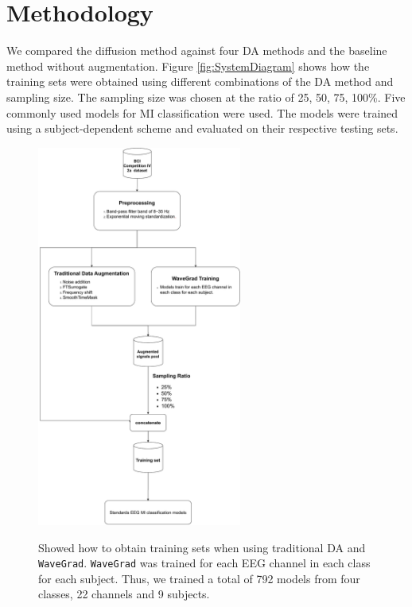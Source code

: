 \section{Methodology}
We compared the diffusion method against four DA methods and the baseline method without augmentation.
Figure \ref{fig:SystemDiagram} shows how the training sets were obtained using different combinations of the DA method and sampling size.
The sampling size was chosen at the ratio of 25, 50, 75, 100\%.
Five commonly used models for MI classification were used.
The models were trained using a subject-dependent scheme and evaluated on their respective testing sets. 

\begin{figure}[ht!]
  \centering
  \caption[System Diagram]{\label{fig:SystemDiagram} Showed how to obtain training sets when using traditional DA and \texttt{WaveGrad}. \texttt{WaveGrad} was trained for each EEG channel in each class for each subject. Thus, we trained a total of 792 models from four classes, 22 channels and 9 subjects.}
  \includegraphics[width=0.6\textwidth]{../fig/dyagram.pdf}
  \label{fig:System}
\end{figure}


